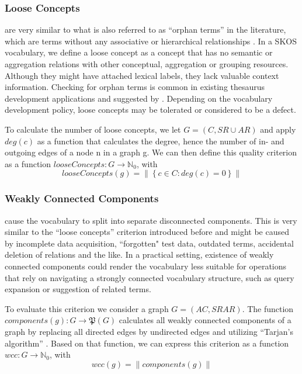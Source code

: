 \documentclass{llncs}
\begin{document}
\subsubsection{Loose Concepts} are very similar to what is also referred to as ``orphan terms” in the literature, which are terms without any associative or hierarchical relationships \cite{Z39.19:2005,Hedden2010}. In a SKOS vocabulary, we define a loose concept as a concept that has no semantic or aggregation relations with other conceptual, aggregation or grouping resources. Although they might have attached lexical labels, they lack valuable context information. Checking for orphan terms is common in existing thesaurus development applications and suggested by \cite{Z39.19:2005}. Depending on the vocabulary development policy, loose concepts may be tolerated or considered to be a defect.

\begin{definition}
To calculate the number of loose concepts, we let \(G = (C, SR \cup AR)\)  and apply \(deg(c)\) as a function that calculates the degree, hence the number of in- and outgoing edges of a node n in a graph g. We can then define this quality criterion as a function \(looseConcepts : G \rightarrow \mathbb{N}_{0}\), with \[looseConcepts(g) = \left\|\left\{c \in C : deg(c) = 0\right\}\right\|\]
\end{definition}

\subsubsection{Weakly Connected Components} cause the vocabulary to split into separate disconnected components. This is very similar to the ``loose concepts” criterion introduced before and might be caused by incomplete data acquisition, ``forgotten" test data, outdated terms, accidental deletion of relations and the like. In a practical setting, existence of weakly connected components could render the vocabulary less suitable for operations that rely on navigating a strongly connected vocabulary structure, such as query expansion or suggestion of related terms.

\begin{definition}
To evaluate this criterion we consider a graph \(G = (AC, SRAR)\). The function \(components(g) : G \rightarrow  \mathfrak{P}(G)\) calculates all weakly connected components of a graph by replacing all directed edges by undirected edges and utilizing “Tarjan’s algorithm” \cite{Hopcroft1973}. Based on that function, we can express this criterion as a function \(wcc : G \rightarrow \mathbb{N}_{0}\), with \[wcc(g) = \left\|components(g)\right\|\]
\end{definition}
\end{document}
